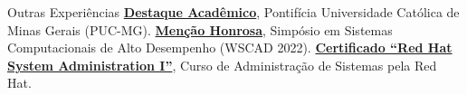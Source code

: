 \begin{rubric}{Outras Experiências}
\entry*[2023] \textbf{\href{https://drive.google.com/file/d/12qYDL3kjxXrC2aeyzYn55hH6AOMMZ2Ni/view?usp=sharing}{Destaque Acadêmico}}, Pontifícia Universidade Católica de Minas Gerais (PUC-MG).
%
\entry*[2022] \textbf{\href{https://drive.google.com/file/d/1EJsnv8WvVObpRNreRR2fV2hepMs9ifsz/view?usp=sharing}{Menção Honrosa}}, Simpósio em Sistemas Computacionais de Alto Desempenho (WSCAD 2022).
%
\entry*[2021] \textbf{\href{https://drive.google.com/file/d/1lU3JSlKmsZNY8PTN7REnLiKwlH6Fkpzm/view?usp=sharing}{Certificado ``Red Hat System Administration I''}}, Curso de Administração de Sistemas pela Red Hat.


\end{rubric}
